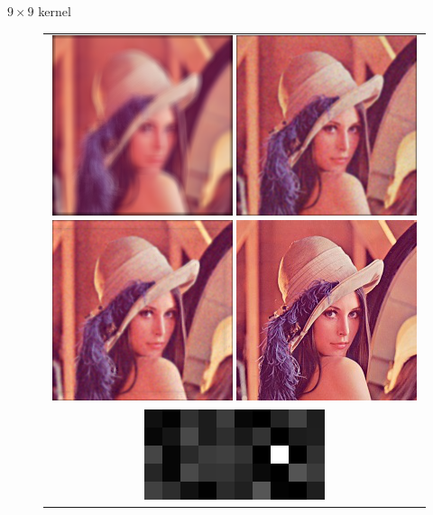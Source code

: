 \documentclass[french]{beamer}
\theoremstyle{plain}
\theoremstyle{remark}
\begin{document}
\begin{frame}{$9 \times 9$ kernel}

\begin{figure}
\begin{center}
	\begin{tabular}{c}	
		\includegraphics[scale=0.5]{images/blurred_9px.png}
		\includegraphics[scale=0.5]{images/denoised_9px.png}
		\includegraphics[scale=0.5]{images/estimation_9px.png}
		\includegraphics[scale=0.5]{images/original_5px.png}\\
		\includegraphics[scale=0.5]{images/kernels_5px.png}
	\end{tabular}
\end{center}
\end{figure}

\end{frame}
\end{document}
